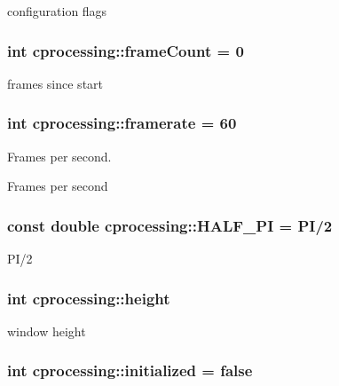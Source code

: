 configuration flags \hypertarget{namespacecprocessing_aca5f2a565e0aca50db1f6d5aa4a4b33d}{
\subsubsection[{frame\-Count}]{\setlength{\rightskip}{0pt plus 5cm}int {\bf cprocessing\-::frame\-Count} = 0}}\label{namespacecprocessing_aca5f2a565e0aca50db1f6d5aa4a4b33d}
frames since start \hypertarget{namespacecprocessing_a7d27ffd61ab47bccc92ab035094e69ee}{
\subsubsection[{framerate}]{\setlength{\rightskip}{0pt plus 5cm}int {\bf cprocessing\-::framerate} = 60}}\label{namespacecprocessing_a7d27ffd61ab47bccc92ab035094e69ee}


\-Frames per second. 

\-Frames per second \hypertarget{namespacecprocessing_a257bee644c97e92e9f9492c569ab863d}{
\subsubsection[{\-H\-A\-L\-F\-\_\-\-P\-I}]{\setlength{\rightskip}{0pt plus 5cm}const double {\bf cprocessing\-::\-H\-A\-L\-F\-\_\-\-P\-I} = {\bf \-P\-I}/2}}\label{namespacecprocessing_a257bee644c97e92e9f9492c569ab863d}
\-P\-I/2 \hypertarget{namespacecprocessing_ac392753eef02e2ad4ad84f5a076919be}{
\subsubsection[{height}]{\setlength{\rightskip}{0pt plus 5cm}int {\bf cprocessing\-::height}}}\label{namespacecprocessing_ac392753eef02e2ad4ad84f5a076919be}


window height 

\hypertarget{namespacecprocessing_abe1272b16cf18357f89ae10c184fbcd2}{
\subsubsection[{initialized}]{\setlength{\rightskip}{0pt plus 5cm}int {\bf cprocessing\-::initialized} = false}}\label{namespacecprocessing_abe1272b16cf18357f89ae10c184fbcd2}


